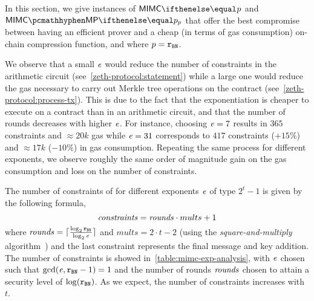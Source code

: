 \newcommand{\constraints}{\varstyle{constraints}}

In this section, we give instances of $\mimcPrime{p}$ and $\mimcMPPrime{p}$ that offer the best compromise between having an efficient prover and a cheap (in terms of gas consumption) on-chain compression function, and where $p=\mathtt{r_{BN}}$.

We observe that a small $\mathit{e}{}$ would reduce the number of constraints in the arithmetic circuit (see~\cref{zeth-protocol:statement}) while a large one would reduce the gas necessary to carry out Merkle tree operations on the contract (see~\cref{zeth-protocol:process-tx}). This is due to the fact that the exponentiation is cheaper to execute on a contract than in an arithmetic circuit, and that the number of rounds decreases with higher $\mathit{e}{}$. For instance, choosing $\mathit{e}{} = 7$ results in $365$ constraints and $\approx 20k$ gas while $\mathit{e}{} = 31$ corresponds to $417$ constraints ($+15\%$) and $\approx 17k$ ($-10\%$) in gas consumption. Repeating the same process for different exponents, we observe roughly the same order of magnitude gain on the gas consumption and loss on the number of constraints.

The number of constraints of \mimcMPPrime{} for different exponents $\mathit{e}{}$ of type $2^t-1$ is given by the following formula,
\[
    \constraints = \rounds \cdot mults + 1
\]
where $\mathit{rounds} = \lceil \frac{\log_2 \mathtt{r_{BN}}}{\log_2 \mathit{e}{}} \rceil$ and $mults = 2 \cdot t - 2$ (using the \emph{square-and-multiply} algorithm~\cite{menezes1996handbook}) and the last constraint represents the final message and key addition. The number of constraints is showed in~\cref{table:mimc-exp-analysis}, with $\mathit{e}{}$ chosen such that $\gcd(\mathit{e}{},\mathtt{r_{BN}} - 1) = 1$ and the number of rounds $\mathit{rounds}$ chosen to attain a security level of $\log(\mathtt{r_{BN}})$. As we expect, the number of constraints increases with $t$.

